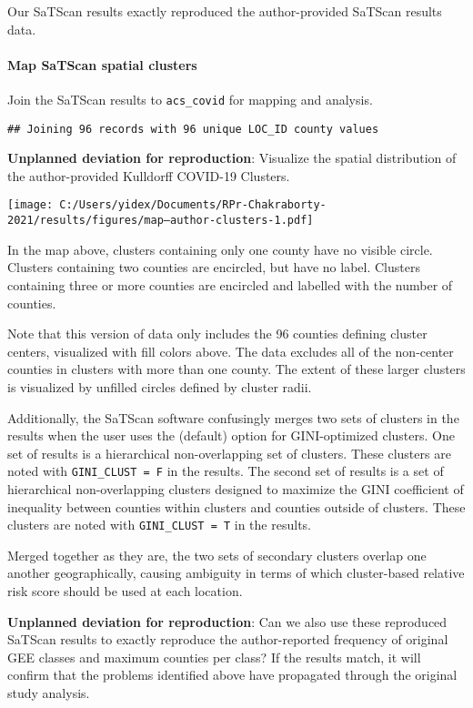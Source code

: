 \documentclass[
]{article}
\begin{document}
Our SaTScan results exactly reproduced the author-provided SaTScan
results data.

\hypertarget{map-satscan-spatial-clusters}{%
\paragraph{Map SaTScan spatial
clusters}\label{map-satscan-spatial-clusters}}

Join the SaTScan results to \texttt{acs\_covid} for mapping and
analysis.

\begin{verbatim}
## Joining 96 records with 96 unique LOC_ID county values
\end{verbatim}

\textbf{Unplanned deviation for reproduction}: Visualize the spatial
distribution of the author-provided Kulldorff COVID-19 Clusters.

\texttt{[image: C:/Users/yidex/Documents/RPr-Chakraborty-2021/results/figures/map--author-clusters-1.pdf]}

In the map above, clusters containing only one county have no visible
circle. Clusters containing two counties are encircled, but have no
label. Clusters containing three or more counties are encircled and
labelled with the number of counties.

Note that this version of data only includes the 96 counties defining
cluster centers, visualized with fill colors above. The data excludes
all of the non-center counties in clusters with more than one county.
The extent of these larger clusters is visualized by unfilled circles
defined by cluster radii.

Additionally, the SaTScan software confusingly merges two sets of
clusters in the results when the user uses the (default) option for
GINI-optimized clusters. One set of results is a hierarchical
non-overlapping set of clusters. These clusters are noted with
\texttt{GINI\_CLUST\ =\ F} in the results. The second set of results is
a set of hierarchical non-overlapping clusters designed to maximize the
GINI coefficient of inequality between counties within clusters and
counties outside of clusters. These clusters are noted with
\texttt{GINI\_CLUST\ =\ T} in the results.

Merged together as they are, the two sets of secondary clusters overlap
one another geographically, causing ambiguity in terms of which
cluster-based relative risk score should be used at each location.

\textbf{Unplanned deviation for reproduction}: Can we also use these
reproduced SaTScan results to exactly reproduce the author-reported
frequency of original GEE classes and maximum counties per class? If the
results match, it will confirm that the problems identified above have
propagated through the original study analysis.
\end{document}
